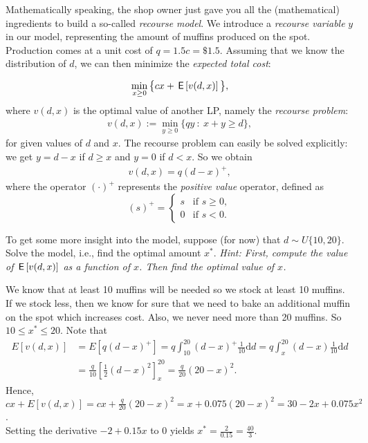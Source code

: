\documentclass[assignments]{subfiles}
\begin{document}
Mathematically speaking, the shop owner just gave you all the (mathematical) ingredients to build a so-called \textit{recourse model}. We introduce a \textit{recourse variable} $y$ in our model, representing the amount of muffins produced on the spot. Production comes at a unit cost of $q = 1.5 c = \$ 1.5$. Assuming that we know the distribution of $d$, we can then minimize the \textit{expected total cost}:

\begin{align}
    \min_{x \geq 0} \big\{ cx + \,\mathsf{E}\left[v(d,x)\right] \big\},
\end{align}
where $v(d,x)$ is the optimal value of another LP, namely the \textit{recourse problem}:
\begin{align}
    v(d,x) := \min_{y \geq 0} \{ qy \ : \ x + y \geq d \},
\end{align}
for given values of $d$ and $x$. The recourse problem can easily be solved explicitly: we get $y=d-x$ if $d \geq x$ and $y=0$ if $d < x$. So we obtain
\begin{align}
    v(d,x) = q (d - x)^+,
\end{align}
where the operator $(\cdot)^+$ represents the \textit{positive value} operator, defined as
\begin{equation}
    (s)^+ = \begin{cases}
    s &\text{if } s \geq 0,\\
    0 &\text{if } s < 0.
    \end{cases}
\end{equation}

\begin{exercise}
To get some more insight into the model, suppose (for now) that $d \sim U\{10, 20\}$.
Solve the model, i.e., find the optimal amount $x^*$.
\textit{Hint: First, compute the value of $\,\mathsf{E}\left[v(d,x)\right]$ as a function of $x$. Then find the optimal value of $x$.}
\begin{solution}
We know that at least 10 muffins will be needed so we stock at least 10 muffins. If we stock less, then we know for sure that we need to bake an additional muffin on the spot which increases cost. Also, we never need more than 20 muffins. So $10 \leq x^* \leq 20$. Note that
 \begin{align*} E\left[v(d,x)\right] &= E\left[q(d-x)^+\right] = q \int_{10}^{20} (d-x)^+ \tfrac{1}{10} \mathrm{d}d  = q \int_{x}^{20} (d-x) \tfrac{1}{10} \mathrm{d}d \\ &= \tfrac{q}{10}\left[\tfrac12(d-x) ^2 \right]_{x}^{20} = \tfrac{q}{20}(20-x)^2. \end{align*}
 Hence, $cx + E\left[v(d,x)\right] = cx + \tfrac{q}{20}(20-x)^2 = x + 0.075(20-x)^2 = 30 - 2x + 0.075x^2$. \\
 Setting the derivative $-2 + 0.15x$ to 0 yields $x^* = \frac{2}{0.15} = \frac{40}{3}$.
\end{solution}
\end{exercise}
\end{document}
